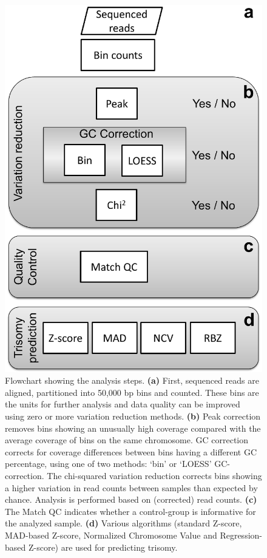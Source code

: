\begin{figure}
	\includegraphics[width=0.6\linewidth]{img/Algorithms_NIPT_Fig1}
	\caption[Flowchart NIPT analysis steps]{Flowchart showing the analysis steps. \textbf{(a)} First, sequenced reads are aligned, partitioned into 50,000 bp bins and counted. These bins are the units for further analysis and data quality can be improved using zero or more variation reduction methods. \textbf{(b)} Peak correction removes bins showing an unusually high coverage compared with the average coverage of bins on the same chromosome. GC correction corrects for coverage differences between bins having a different GC percentage, using one of two methods: ‘bin’ or ‘LOESS’ GC-correction. The chi-squared variation reduction corrects bins showing a higher variation in read counts between samples than expected by chance. Analysis is performed based on (corrected) read counts. \textbf{(c)} The Match QC indicates whether a control-group is informative for the analyzed sample. \textbf{(d)} Various algorithms (standard Z-score, MAD-based Z-score, Normalized Chromosome Value and Regression-based Z-score) are used for predicting trisomy.}
	\label{fig:Algorithms_NIPT_Fig1}
\end{figure}

